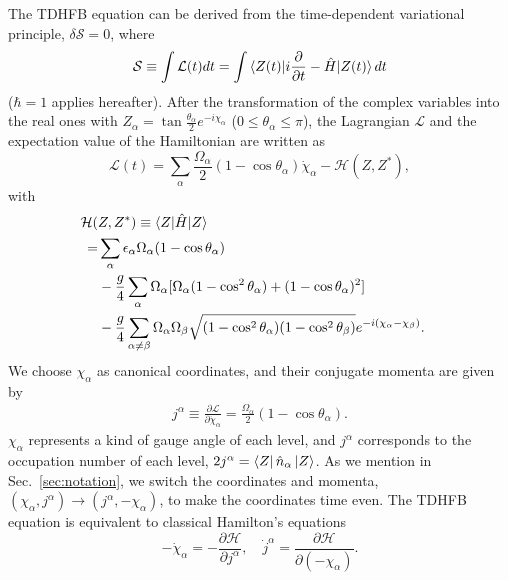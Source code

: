 \documentclass[%
superscriptaddress,
showpacs,
nofootinbib,
amsmath,amssymb,
aps,
prc,
twocolumn,
floatfix ]%
{revtex4-1}
\begin{document}
The TDHFB equation can be derived from the time-dependent variational
principle, $\delta \mathcal{S} = 0$, where
\begin{equation}
	\mathcal{S}\equiv \int \mathcal{L}(t) dt =
	\int \braket{Z(t)|i\frac{\partial}{\partial t}-\hat{H}|Z(t)}dt
  \label{TDHFB}
\end{equation}
($\hbar=1$ applies hereafter).
After the transformation of the complex variables into the real ones with
$Z_\alpha = \tan{\frac{\theta_\alpha}{2}}e^{-i\chi_\alpha}$
($0\leq\theta_\alpha\leq\pi$),
the Lagrangian $\mathcal{L}$ and the expectation value of the Hamiltonian
are written as
\begin{equation}
\mathcal{L}(t) = \sum_\alpha \frac{\Omega_\alpha}{2}
	(1-\cos{\theta}_\alpha)\dot{\chi}_\alpha - \mathcal{H}(Z,Z^*) ,
\end{equation}
with
\begin{align}
	\mathcal{H}( &Z,Z^*) \equiv \braket{Z|\hat{H}|Z}& \nonumber \\
	=& \sum_\alpha \epsilon_\alpha\Omega_\alpha(1- \cos{\theta}_\alpha)
	\nonumber \\
	&- \frac{g}{4}\sum_\alpha \Omega_\alpha [\Omega_\alpha(1-\cos^2{\theta}_\alpha)+(1-\cos{\theta}_\alpha)^2] \nonumber \\
& - \frac{g}{4}\sum_{\alpha\neq \beta} \Omega_{\alpha}\Omega_{\beta} \sqrt{(1-\cos^2{\theta}_{\alpha})(1-\cos^2{\theta}_{\beta})}e^{-i(\chi_{\alpha}-\chi_{\beta})}   .
\label{TDHFB_Hamiltonian_2}
\end{align}
We choose $\chi_\alpha$ as canonical coordinates, and their conjugate momenta
are given by
\begin{align}
  j^\alpha\equiv
	\frac{\partial\mathcal{L}}{\partial\dot{\chi}_\alpha}=\frac{\Omega_\alpha}{2}
	(1-\cos{\theta}_\alpha) .
\end{align}
$\chi_\alpha$ represents a kind of gauge angle of each level,
and $j^\alpha$ corresponds to the occupation number of each level,
$2j^\alpha=\bra{Z} \hat{n}_\alpha\ket{Z}$. 
As we mention in Sec.~\ref{sec:notation},
we switch the coordinates and momenta,
$(\chi_\alpha,j^\alpha) \rightarrow (j^\alpha,-\chi_\alpha)$,
to make the coordinates time even.
The TDHFB equation is equivalent to classical Hamilton's equations
\begin{equation}
	-\dot{\chi}_\alpha = -\frac{\partial\mathcal{H}}{\partial j^\alpha}, \quad
	\dot{j}^\alpha = \frac{\partial\mathcal{H}}{\partial (-\chi_\alpha)} .
\end{equation}
\end{document}
